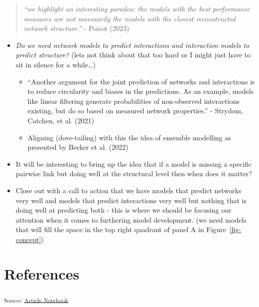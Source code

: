 \documentclass[
]{article}
\begin{document}
\begin{quote}
\emph{``we highlight an interesting paradox: the models with the best
performance measures are not necessarily the models with the closest
reconstructed network structure.''} - Poisot (2023)
\end{quote}

\begin{itemize}
\item
  \emph{Do we need network models to predict interactions and
  interaction models to predict structure?} (lets not think about that
  too hard or I might just have to sit in silence for a while\ldots)

  \begin{itemize}
  \item
    ``Another argument for the joint prediction of networks and
    interactions is to reduce circularity and biases in the predictions.
    As an example, models like linear filtering generate probabilities
    of non-observed interactions existing, but do so based on measured
    network properties.'' - Strydom, Catchen, et al. (2021)
  \item
    Aligning (dove-tailing) with this the idea of ensemble modelling as
    presented by Becker et al. (2022)
  \end{itemize}
\item
  It will be interesting to bring up the idea that if a model is missing
  a specific pairwise link but doing well at the structural level then
  when does it matter?
\item
  Close out with a call to action that we have models that predict
  networks very well and models that predict interactions very well but
  nothing that is doing well at predicting both - this is where we
  should be focusing our attention when it comes to furthering model
  development. (we need models that will fill the space in the top right
  quadrant of panel A in Figure~\ref{fig-concept})
\end{itemize}

\section*{References}\label{references}

\textsubscript{Source:
\href{https://BecksLab.github.io/ms_t_is_for_topology/index.qmd.html}{Article
Notebook}}
\end{document}
